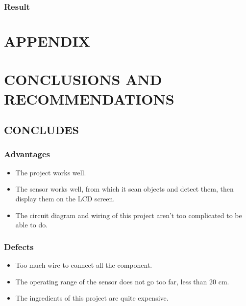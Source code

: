 \documentclass[13pt,a4paper]{report}
\begin{document}
            \subsection{Result}

    \chapter{APPENDIX}
    \renewcommand{\headrulewidth}{0.5pt}
    \renewcommand{\footrulewidth}{0.5pt}
    \thispagestyle{fancy}
    \fancyhf{}
    \raggedright
        

    \chapter{CONCLUSIONS AND RECOMMENDATIONS}
    \renewcommand{\headrulewidth}{0.5pt}
    \renewcommand{\footrulewidth}{0.5pt}
    \thispagestyle{fancy}
    \fancyhf{}
    \raggedright
        \section{CONCLUDES}
            \subsection{\large{Advantages}}
                \begin{itemize}
                    \item The project works well.
                    \item The sensor works well, from which it scan objects and detect them, then 
                    display them on the LCD screen.
                    \item The circuit diagram and wiring of this project aren't too complicated to be 
                    able to do.
                \end{itemize}
            \subsection{\large{Defects}}
                \begin{itemize}
                    \item Too much wire to connect all the component.
                    \item The operating range of the sensor does not go too far, less than 20 cm.
                    \item The ingredients of this project are quite expensive.
                \end{itemize}
\end{document}

